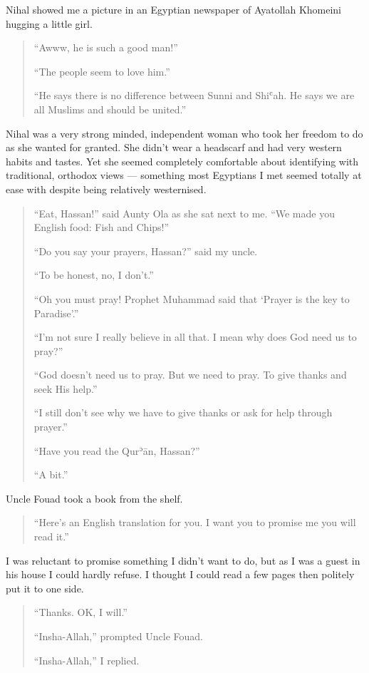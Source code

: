 \documentclass[12pt]{memoir}
\def\´{ʾ} %
\def\`{ʿ} %
\def \Quran{Qur\-\´ān} %
\begin{document}
Nihal showed me a picture in an Egyptian newspaper
of Ayatollah Khomeini hugging a little girl.

\begin{quote}
“Awww, he is such a good man!”

“The people seem to love him.”

“He says there is no difference between Sunni and Shi\`ah.
He says we are all Muslims and should be united.”
\end{quote}

Nihal was a very strong minded,
independent woman who took her freedom to do as she wanted for granted.
She didn’t wear a headscarf and had very western habits and tastes.
Yet she seemed completely comfortable about identifying with traditional,
orthodox views — something most Egyptians I met
seemed totally at ease with despite being relatively westernised.

\begin{quote}
“Eat, Hassan!” said Aunty Ola as she sat next to me.
“We made you English food: Fish and Chips!”

“Do you say your prayers, Hassan?” said my uncle.

“To be honest, no, I don’t.”

“Oh you must pray!
Prophet Muhammad said that ‘Prayer is the key to Paradise’.”

“I’m not sure I really believe in all that.
I mean why does God need us to pray?”

“God doesn’t need us to pray.
But we need to pray.
To give thanks and seek His help.”

“I still don’t see why we have to give thanks or ask for help through prayer.”

“Have you read the \Quran, Hassan?”

“A bit.”
\end{quote}

Uncle Fouad took a book from the shelf.

\begin{quote}
“Here’s an English translation for you.
I want you to promise me you will read it.”
\end{quote}

I was reluctant to promise something I didn’t want to do,
but as I was a guest in his house I could hardly refuse.
I thought I could read a few pages then politely put it to one side.

\begin{quote}
“Thanks. OK, I will.”

“Insha-Allah,” prompted Uncle Fouad.

“Insha-Allah,” I replied.
\end{quote}
\end{document}
